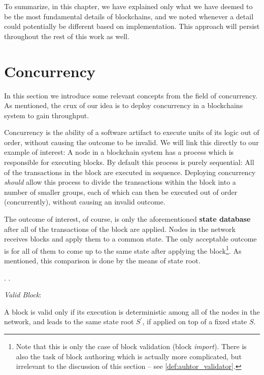 To summarize, in this chapter, we have explained only what we have deemed to be the most fundamental
details of blockchains, and we noted whenever a detail could potentially be different based on
implementation. This approach will persist throughout the rest of this work as well.

\section{Concurrency} \label{chap_bg:sec:concurrency}

In this section we introduce some relevant concepts from the field of concurrency. As mentioned, the
crux of our idea is to deploy concurrency in a blockchains system to gain throughput.

Concurrency is the ability of a software artifact to execute units of its logic out of order,
without causing the outcome to be invalid. We will link this directly to our example of interest: A
node in a blockchain system has a process which is responsible for executing blocks. By default this
process is purely sequential: All of the transactions in the block are executed in sequence.
Deploying concurrency \textit{should} allow this process to divide the transactions within the block
into a number of smaller groups, each of which can then be executed out of order (concurrently),
without causing an invalid outcome.

The outcome of interest, of course, is only the aforementioned \textbf{state database} after all of
the transactions of the block are applied. Nodes in the network receives blocks and apply them to a
common state. The only acceptable outcome is for all of them to come up to the same state after
applying the block\footnote{Note that this is only the case of block validation (block
\textit{import}). There is also the task of block authoring which is actually more complicated, but
irrelevant to the discussion of this section -- see \ref{def:auhtor_validator}.}. As mentioned, this
comparison is done by the means of state root.

.
.

\begin{definition}
	\textit{Valid Block}:


	A block is valid only if its execution is deterministic among all of the nodes in the network,
	and leads to the same state root $S^{'}$, if applied on top of a fixed state $S$.
\end{definition}

